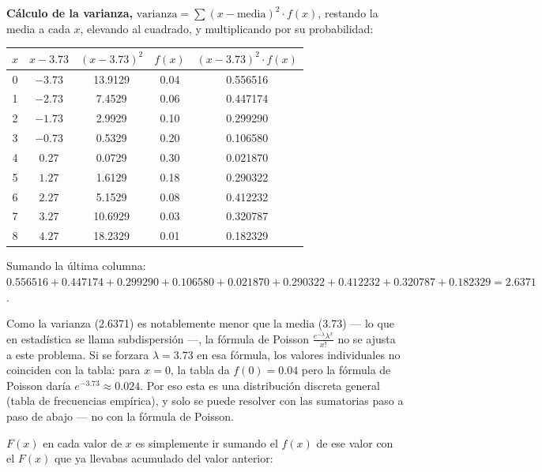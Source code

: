 \documentclass[12pt]{article}
\begin{document}
\begin{description}
    \textbf{Cálculo de la varianza,} $\text{varianza} = \sum (x-\text{media})^2 \cdot f(x)$, restando la media a cada $x$, elevando al cuadrado, y multiplicando por su probabilidad:
    \begin{center}
    \small
    \begin{tabular}{ccccc}
    \toprule
    $x$ & $x-3.73$ & $(x-3.73)^2$ & $f(x)$ & $(x-3.73)^2 \cdot f(x)$ \\
    \midrule
    0 & $-3.73$ & 13.9129 & 0.04 & 0.556516 \\
    1 & $-2.73$ & 7.4529  & 0.06 & 0.447174 \\
    2 & $-1.73$ & 2.9929  & 0.10 & 0.299290 \\
    3 & $-0.73$ & 0.5329  & 0.20 & 0.106580 \\
    4 & $0.27$  & 0.0729  & 0.30 & 0.021870 \\
    5 & $1.27$  & 1.6129  & 0.18 & 0.290322 \\
    6 & $2.27$  & 5.1529  & 0.08 & 0.412232 \\
    7 & $3.27$  & 10.6929 & 0.03 & 0.320787 \\
    8 & $4.27$  & 18.2329 & 0.01 & 0.182329 \\
    \bottomrule
    \end{tabular}
    \end{center}
    Sumando la última columna: $0.556516+0.447174+0.299290+0.106580+0.021870+0.290322+0.412232+0.320787+0.182329 = 2.6371$.

    Como la varianza (2.6371) es notablemente menor que la media (3.73) — lo que en estadística se llama subdispersión —, la fórmula de Poisson $\frac{e^{-\lambda}\lambda^x}{x!}$ no se ajusta a este problema. Si se forzara $\lambda=3.73$ en esa fórmula, los valores individuales no coinciden con la tabla: para $x=0$, la tabla da $f(0)=0.04$ pero la fórmula de Poisson daría $e^{-3.73}\approx 0.024$. Por eso esta es una distribución discreta general (tabla de frecuencias empírica), y solo se puede resolver con las sumatorias paso a paso de abajo — no con la fórmula de Poisson.

    \item[Paso 2: Determinar la función acumulada $F(x)$]

    $F(x)$ en cada valor de $x$ es simplemente ir sumando el $f(x)$ de ese valor con el $F(x)$ que ya llevabas acumulado del valor anterior:


\end{description}
\end{document}
